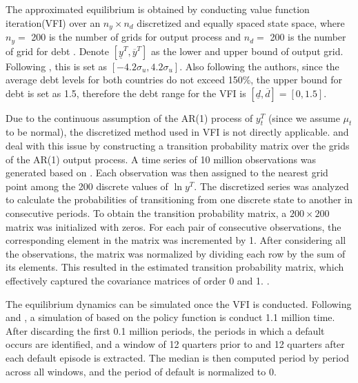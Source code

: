 The approximated equilibrium is obtained by conducting value function iteration(VFI) over an $n_y \times n_d$ discretized and equally spaced state space, where $n_y = $ 200 is the number of grids for output process and $n_d=$ 200 is the number of grid for debt \citep{Na-18}. Denote $[\underline{y}^T, \overline{y}^T]$ as the lower and upper bound of output grid. Following \citet{Uribe-Schmitt-Grohe-textbook}, this is set as $[-4.2 \sigma_u, 4.2 \sigma_u]$. Also following the authors, since the average debt levels for both countries do not exceed 150\%, the upper bound for debt is set as 1.5, therefore the debt range for the VFI is $[\underline{d}, \overline{d}]=[0,1.5]$.

Due to the continuous assumption of the AR(1) process of $y^T_t$ (since we assume $\mu_t$ to be normal), the discretized method used in VFI is not directly applicable. \citet{Schmitt-Uribe-16} and \citet{Na-18} deal with this issue by constructing a transition probability matrix over the grids of the AR(1) output process.
A time series of 10 million observations was generated based on . Each observation was then assigned to the nearest grid point among the 200 discrete values of $\ln y^T$. The discretized series was analyzed to calculate the probabilities of transitioning from one discrete state to another in consecutive periods.
To obtain the transition probability matrix, a $200\times200$ matrix was initialized with zeros. For each pair of consecutive observations, the corresponding element in the matrix was incremented by 1. After considering all the observations, the matrix was normalized by dividing each row by the sum of its elements. This resulted in the estimated transition probability matrix, which effectively captured the covariance matrices of order 0 and 1.
\citep*{Uribe-Schmitt-Grohe-textbook}.


The equilibrium dynamics can be simulated once the VFI is conducted. Following \citet{Schmitt-Uribe-16}
and \citet{Na-18}, a simulation of based on the policy function is conduct 1.1 million time. After discarding the first 0.1 million periods, the periods in which a default occurs are identified, and a window of 12 quarters prior to and 12 quarters after each default episode is extracted. The median is then computed period by period across all windows, and the period of default is normalized to 0.